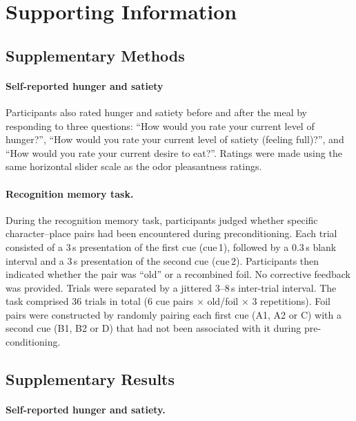 \documentclass[9pt]{article}
\begin{document}
\section*{Supporting Information}

\subsection*{Supplementary Methods}


\paragraph*{Self-reported hunger and satiety}

Participants also rated hunger and satiety before and after the meal by responding to three questions: “How would you rate your current level of hunger?”, “How would you rate your current level of satiety (feeling full)?”, and “How would you rate your current desire to eat?”. Ratings were made using the same horizontal slider scale as the odor pleasantness ratings.

\paragraph*{Recognition memory task.}



During the recognition memory task, participants judged whether specific character--place pairs had been encountered during preconditioning. Each trial consisted of a 3\,s presentation of the first cue (cue\,1), followed by a 0.3\,s blank interval and a 3\,s presentation of the second cue (cue\,2). Participants then indicated whether the pair was ``old'' or a recombined foil. No corrective feedback was provided. Trials were separated by a jittered 3--8\,s inter-trial interval. The task comprised 36 trials in total (6 cue pairs $\times$ old/foil $\times$ 3 repetitions). Foil pairs were constructed by randomly pairing each first cue (A1, A2 or C) with a second cue (B1, B2 or D) that had not been associated with it during pre-conditioning.

\subsection*{Supplementary Results}

\paragraph*{Self-reported hunger and satiety.}
\end{document}
